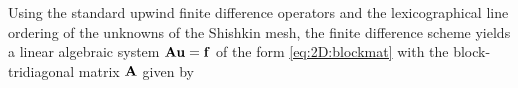 %

Using the standard upwind finite difference operators and the lexicographical
line ordering of the unknowns of the Shishkin mesh, the finite difference scheme
yields a linear algebraic system $\mathbf{A}\mathbf{u}=\mathbf{f}$ of the form \eqref{eq:2D:blockmat}
with the block-tridiagonal matrix $\mathbf{A}$ given by

